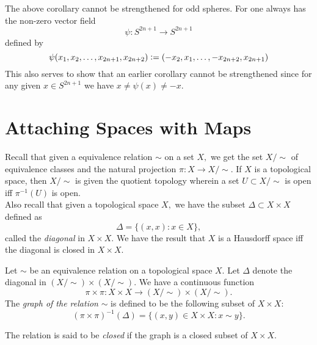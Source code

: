 \documentclass[12pt]{article}
\begin{document}
\begin{ex}
	The above corollary cannot be strengthened for odd spheres. For one always has the non-zero vector field
	\begin{equation*} 
		\psi:S^{2n + 1} \to S^{2n + 1}
	\end{equation*}
	defined by
	\begin{equation*} 
		\psi(x_1, x_2, \ldots, x_{2n+1}, x_{2n + 2}) \vcentcolon= (-x_2, x_1, \ldots, -x_{2n+2}, x_{2n + 1})
	\end{equation*}
	This also serves to show that an earlier corollary cannot be strengthened since for any given $x \in S^{2n + 1}$ we have $x \neq \psi(x) \neq -x.$
\end{ex}

\section{Attaching Spaces with Maps}
Recall that given a equivalence relation $\sim$ on a set $X,$ we get the set $X/{\sim}$ of equivalence classes and the natural projection $\pi:X \to X/{\sim}.$ If $X$ is a topological space, then $X/{\sim}$ is given the quotient topology wherein a set $U \subset X/{\sim}$ is open iff $\pi^{-1}(U)$ is open.\\
Also recall that given a topological space $X,$ we have the subset $\Delta \subset X \times X$ defined as
\begin{equation*} 
	\Delta = \{(x, x) : x \in X\},
\end{equation*}
called the \emph{diagonal} in $X \times X.$ We have the result that $X$ is a Hausdorff space iff the diagonal is closed in $X \times X.$ 

\begin{defn}
	Let $\sim$ be an equivalence relation on a topological space $X.$ Let $\Delta$ denote the diagonal in $(X/{\sim})\times(X/{\sim}).$ We have a continuous function
	\begin{equation*} 
		\pi\times\pi:X\times X \to (X/{\sim})\times(X/{\sim}).
	\end{equation*}
	The \emph{graph of the relation} $\sim$ is defined to be the following subset of $X \times X:$
	\begin{equation*} 
		(\pi\times\pi)^{-1}(\Delta) = \{(x, y) \in X\times X : x \sim y\}.
	\end{equation*}

	The relation is said to be \emph{closed} if the graph is a closed subset of $X \times X.$
\end{defn}
\end{document}
